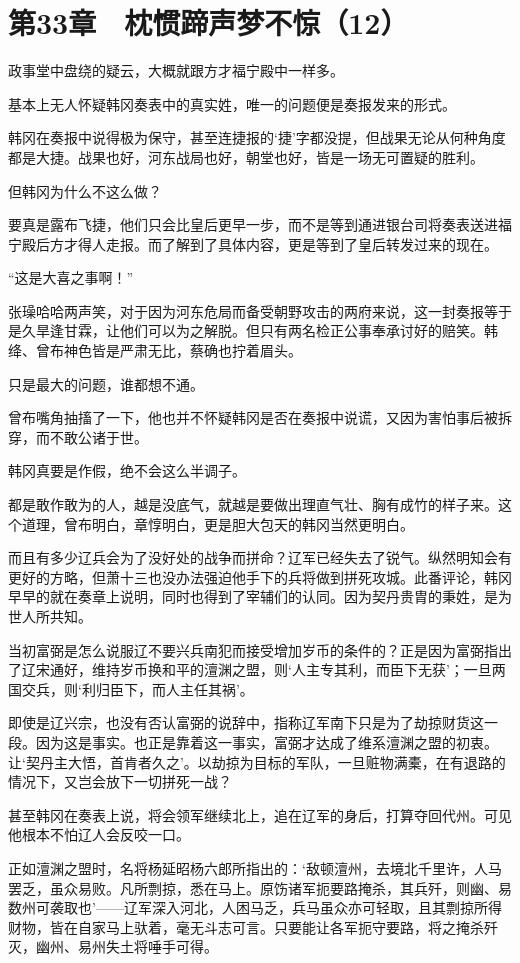 \section{第33章　枕惯蹄声梦不惊（12）}

政事堂中盘绕的疑云，大概就跟方才福宁殿中一样多。

基本上无人怀疑韩冈奏表中的真实姓，唯一的问题便是奏报发来的形式。

韩冈在奏报中说得极为保守，甚至连捷报的‘捷’字都没提，但战果无论从何种角度都是大捷。战果也好，河东战局也好，朝堂也好，皆是一场无可置疑的胜利。

但韩冈为什么不这么做？

要真是露布飞捷，他们只会比皇后更早一步，而不是等到通进银台司将奏表送进福宁殿后方才得人走报。而了解到了具体内容，更是等到了皇后转发过来的现在。

“这是大喜之事啊！”

张璪哈哈两声笑，对于因为河东危局而备受朝野攻击的两府来说，这一封奏报等于是久旱逢甘霖，让他们可以为之解脱。但只有两名检正公事奉承讨好的赔笑。韩绛、曾布神色皆是严肃无比，蔡确也拧着眉头。

只是最大的问题，谁都想不通。

曾布嘴角抽搐了一下，他也并不怀疑韩冈是否在奏报中说谎，又因为害怕事后被拆穿，而不敢公诸于世。

韩冈真要是作假，绝不会这么半调子。

都是敢作敢为的人，越是没底气，就越是要做出理直气壮、胸有成竹的样子来。这个道理，曾布明白，章惇明白，更是胆大包天的韩冈当然更明白。

而且有多少辽兵会为了没好处的战争而拼命？辽军已经失去了锐气。纵然明知会有更好的方略，但萧十三也没办法强迫他手下的兵将做到拼死攻城。此番评论，韩冈早早的就在奏章上说明，同时也得到了宰辅们的认同。因为契丹贵胄的秉姓，是为世人所共知。

当初富弼是怎么说服辽不要兴兵南犯而接受增加岁币的条件的？正是因为富弼指出了辽宋通好，维持岁币换和平的澶渊之盟，则‘人主专其利，而臣下无获’；一旦两国交兵，则‘利归臣下，而人主任其祸’。

即使是辽兴宗，也没有否认富弼的说辞中，指称辽军南下只是为了劫掠财货这一段。因为这是事实。也正是靠着这一事实，富弼才达成了维系澶渊之盟的初衷。让‘契丹主大悟，首肯者久之’。以劫掠为目标的军队，一旦赃物满橐，在有退路的情况下，又岂会放下一切拼死一战？

甚至韩冈在奏表上说，将会领军继续北上，追在辽军的身后，打算夺回代州。可见他根本不怕辽人会反咬一口。

正如澶渊之盟时，名将杨延昭杨六郎所指出的：‘敌顿澶州，去境北千里许，人马罢乏，虽众易败。凡所剽掠，悉在马上。原饬诸军扼要路掩杀，其兵歼，则幽、易数州可袭取也’——辽军深入河北，人困马乏，兵马虽众亦可轻取，且其剽掠所得财物，皆在自家马上驮着，毫无斗志可言。只要能让各军扼守要路，将之掩杀歼灭，幽州、易州失土将唾手可得。

